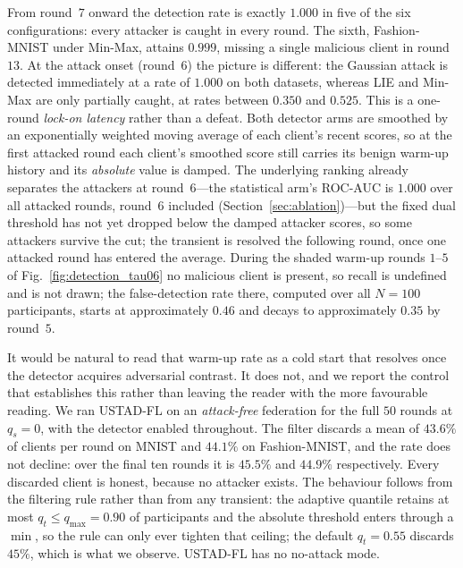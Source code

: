 \documentclass[journal]{IEEEtran}
\begin{document}
From round~$7$ onward the detection rate is exactly $1.000$ in five of the six configurations: every attacker is caught in every round. The sixth, Fashion-MNIST under Min-Max, attains $0.999$, missing a single malicious client in round~$13$. At the attack onset (round~$6$) the picture is different: the Gaussian attack is detected immediately at a rate of $1.000$ on both datasets, whereas LIE and Min-Max are only partially caught, at rates between $0.350$ and $0.525$. This is a one-round \emph{lock-on latency} rather than a defeat. Both detector arms are smoothed by an exponentially weighted moving average of each client's recent scores, so at the first attacked round each client's smoothed score still carries its benign warm-up history and its \emph{absolute} value is damped. The underlying ranking already separates the attackers at round~$6$---the statistical arm's ROC-AUC is $1.000$ over all attacked rounds, round~$6$ included (Section~\ref{sec:ablation})---but the fixed dual threshold has not yet dropped below the damped attacker scores, so some attackers survive the cut; the transient is resolved the following round, once one attacked round has entered the average. During the shaded warm-up rounds $1$--$5$ of Fig.~\ref{fig:detection_tau06} no malicious client is present, so recall is undefined and is not drawn; the false-detection rate there, computed over all $N = 100$ participants, starts at approximately $0.46$ and decays to approximately $0.35$ by round~$5$.

It would be natural to read that warm-up rate as a cold start that resolves once the detector acquires adversarial contrast. It does not, and we report the control that establishes this rather than leaving the reader with the more favourable reading. We ran USTAD-FL on an \emph{attack-free} federation for the full $50$ rounds at $q_s = 0$, with the detector enabled throughout. The filter discards a mean of $43.6\%$ of clients per round on MNIST and $44.1\%$ on Fashion-MNIST, and the rate does not decline: over the final ten rounds it is $45.5\%$ and $44.9\%$ respectively. Every discarded client is honest, because no attacker exists. The behaviour follows from the filtering rule rather than from any transient: the adaptive quantile retains at most $q_t \le q_{\max} = 0.90$ of participants and the absolute threshold enters through a $\min$, so the rule can only ever tighten that ceiling; the default $q_t = 0.55$ discards $45\%$, which is what we observe. USTAD-FL has no no-attack mode.
\end{document}
